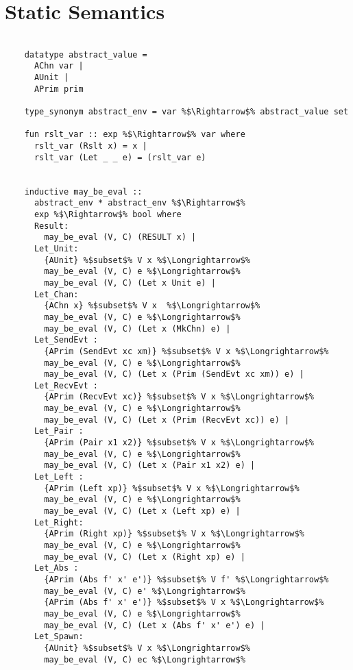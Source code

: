 \documentclass{article}
\begin{document}
\section{Static Semantics}
  \begin{lstlisting}[style=codestyle1, escapechar=\%]

    datatype abstract_value =
      AChn var |
      AUnit |
      APrim prim

    type_synonym abstract_env = var %$\Rightarrow$% abstract_value set

    fun rslt_var :: exp %$\Rightarrow$% var where
      rslt_var (Rslt x) = x |
      rslt_var (Let _ _ e) = (rslt_var e)


    inductive may_be_eval ::
      abstract_env * abstract_env %$\Rightarrow$%
      exp %$\Rightarrow$% bool where
      Result:
        may_be_eval (V, C) (RESULT x) |
      Let_Unit:
        {AUnit} %$subset$% V x %$\Longrightarrow$%
        may_be_eval (V, C) e %$\Longrightarrow$% 
        may_be_eval (V, C) (Let x Unit e) |
      Let_Chan: 
        {AChn x} %$subset$% V x  %$\Longrightarrow$%
        may_be_eval (V, C) e %$\Longrightarrow$%
        may_be_eval (V, C) (Let x (MkChn) e) |
      Let_SendEvt : 
        {APrim (SendEvt xc xm)} %$subset$% V x %$\Longrightarrow$%
        may_be_eval (V, C) e %$\Longrightarrow$% 
        may_be_eval (V, C) (Let x (Prim (SendEvt xc xm)) e) |
      Let_RecvEvt :
        {APrim (RecvEvt xc)} %$subset$% V x %$\Longrightarrow$%
        may_be_eval (V, C) e %$\Longrightarrow$% 
        may_be_eval (V, C) (Let x (Prim (RecvEvt xc)) e) |
      Let_Pair : 
        {APrim (Pair x1 x2)} %$subset$% V x %$\Longrightarrow$%
        may_be_eval (V, C) e %$\Longrightarrow$% 
        may_be_eval (V, C) (Let x (Pair x1 x2) e) |
      Let_Left : 
        {APrim (Left xp)} %$subset$% V x %$\Longrightarrow$%
        may_be_eval (V, C) e %$\Longrightarrow$% 
        may_be_eval (V, C) (Let x (Left xp) e) |
      Let_Right:
        {APrim (Right xp)} %$subset$% V x %$\Longrightarrow$%
        may_be_eval (V, C) e %$\Longrightarrow$% 
        may_be_eval (V, C) (Let x (Right xp) e) |
      Let_Abs : 
        {APrim (Abs f' x' e')} %$subset$% V f' %$\Longrightarrow$%
        may_be_eval (V, C) e' %$\Longrightarrow$%
        {APrim (Abs f' x' e')} %$subset$% V x %$\Longrightarrow$%
        may_be_eval (V, C) e %$\Longrightarrow$% 
        may_be_eval (V, C) (Let x (Abs f' x' e') e) |
      Let_Spawn:
        {AUnit} %$subset$% V x %$\Longrightarrow$%
        may_be_eval (V, C) ec %$\Longrightarrow$% 

\end{lstlisting}
\end{document}

